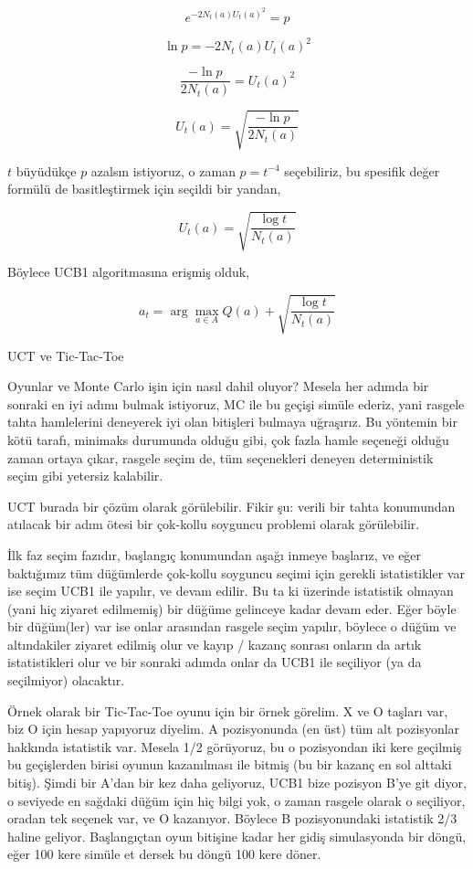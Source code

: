 \documentclass[12pt,fleqn]{article}\usepackage{../../common}
\begin{document}
$$ e^{-2 N_t(a)U_t(a)^2 } = p $$ 

$$ \ln p = -2 N_t(a)U_t(a)^2 $$

$$ \frac{-\ln p}{2 N_t(a)} = U_t(a)^2 $$

$$ U_t(a) = \sqrt{\frac{-\ln p}{2 N_t(a)}} $$

$t$ büyüdükçe $p$ azalsın istiyoruz, o zaman $p = t^{-4}$ seçebiliriz, bu
spesifik değer formülü de basitleştirmek için seçildi bir yandan,

$$ U_t(a) = \sqrt{\frac{\log t}{N_t(a)}} $$

Böylece UCB1 algoritmasına erişmiş olduk, 

$$ 
a_t = \arg \max_{a \in A} Q(a) + \sqrt{\frac{\log t}{N_t(a)}}
$$

UCT ve Tic-Tac-Toe

Oyunlar ve Monte Carlo işin için nasıl dahil oluyor? Mesela her adımda bir
sonraki en iyi adımı bulmak istiyoruz, MC ile bu geçişi simüle ederiz, yani
rasgele tahta hamlelerini deneyerek iyi olan bitişleri bulmaya
uğraşırız. Bu yöntemin bir kötü tarafı, minimaks durumunda olduğu gibi, çok
fazla hamle seçeneği olduğu zaman ortaya çıkar, rasgele seçim de,
tüm seçenekleri deneyen deterministik seçim gibi yetersiz kalabilir.

UCT burada bir çözüm olarak görülebilir. Fikir şu: verili bir tahta
konumundan atılacak bir adım ötesi bir çok-kollu soyguncu problemi olarak
görülebilir. 

İlk faz seçim fazıdır, başlangıç konumundan aşağı inmeye başlarız, ve eğer
baktığımız tüm düğümlerde çok-kollu soyguncu seçimi için gerekli
istatistikler var ise seçim UCB1 ile yapılır, ve devam edilir. Bu ta ki
üzerinde istatistik olmayan (yani hiç ziyaret edilmemiş) bir düğüme
gelinceye kadar devam eder. Eğer böyle bir düğüm(ler) var ise onlar
arasından rasgele seçim yapılır, böylece o düğüm ve altındakiler ziyaret
edilmiş olur ve kayıp / kazanç sonrası onların da artık istatistikleri olur
ve bir sonraki adımda onlar da UCB1 ile seçiliyor (ya da seçilmiyor)
olacaktır.

Örnek olarak bir Tic-Tac-Toe oyunu için bir örnek görelim. X ve O taşları
var, biz O için hesap yapıyoruz diyelim. A pozisyonunda (en üst) tüm alt
pozisyonlar hakkında istatistik var. Mesela 1/2 görüyoruz, bu o pozisyondan
iki kere geçilmiş bu geçişlerden birisi oyunun kazanılması ile bitmiş (bu
bir kazanç en sol alttaki bitiş). Şimdi bir A'dan bir kez daha geliyoruz,
UCB1 bize pozisyon B'ye git diyor, o seviyede en sağdaki düğüm için hiç
bilgi yok, o zaman rasgele olarak o seçiliyor, oradan tek seçenek var, ve O
kazanıyor. Böylece B pozisyonundaki istatistik 2/3 haline
geliyor. Başlangıçtan oyun bitişine kadar her gidiş simulasyonda bir döngü,
eğer 100 kere simüle et dersek bu döngü 100 kere döner.
\end{document}
